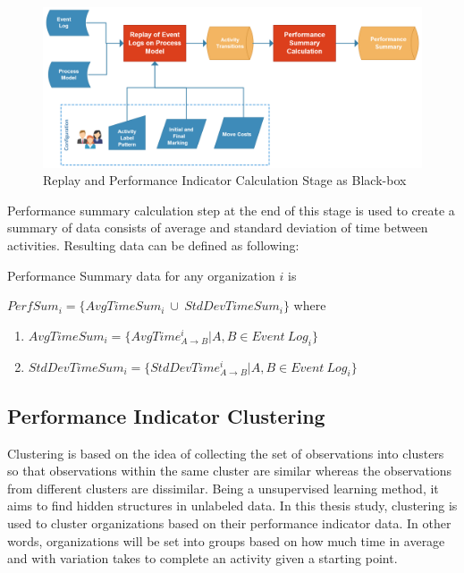 \begin{figure}
  \centering
  \includegraphics[width=\textwidth]{4_methodology/replay-and-performance-indicator-calculation}
  \caption{Replay and Performance Indicator Calculation Stage as Black-box}
  \label{fig:replay-and-performance-indicator-calculation}
\end{figure}

Performance summary calculation step at the end of this stage is used to create a summary of data consists of average and standard deviation of time between activities. Resulting data can be defined as following:
	\theoremstyle{definition}
	\begin{definition}{} Performance Summary data for any organization $i$ is 

	$PerfSum_{i}= \{AvgTimeSum_{i}\ \cup\ StdDevTimeSum_{i}\}$ where
		\begin{enumerate}
			\item $AvgTimeSum_{i} = \{ AvgTime_{A \rightarrow B}^{i} | A , B  \in Event\ Log_{i}\}$
			\item $StdDevTimeSum_{i} = \{ StdDevTime_{ A\rightarrow B}^{i} | A, B  \in Event\ Log_{i}\}$
		\end{enumerate}
	\end{definition}

\subsection{Performance Indicator Clustering}
\label{subsec:performance-indicator-clustering}

Clustering is based on the idea of collecting the set of observations into clusters so that observations within the same cluster are similar whereas the observations from different clusters are dissimilar. Being a unsupervised learning method, it aims to find hidden structures in unlabeled data. In this thesis study, clustering is used to cluster organizations based on their performance indicator data. In other words, organizations will be set into groups based on how much time in average and with variation takes to complete an activity given a starting point.

